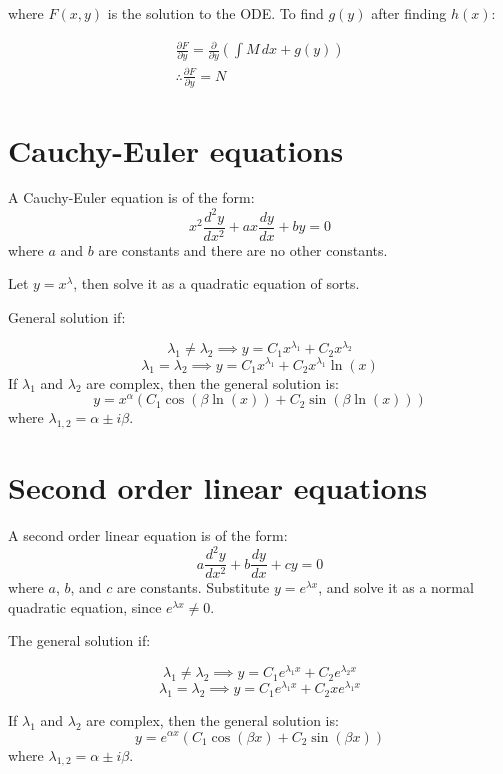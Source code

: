 \documentclass{scrartcl}
\begin{document}
where \(F(x,y)\) is the solution to the ODE. To find \(g(y)\) after finding \(h(x)\):

\begin{center}
    \begin{gather}
            \frac{\partial F}{\partial y} = \frac{\partial}{\partial y}\left(\int M \, dx + g(y)\right) \\
            \therefore{} \frac{\partial F}{\partial y} = N
    \end{gather}
\end{center}

\section{Cauchy-Euler equations}
A Cauchy-Euler equation is of the form:
\[
x^2\frac{d^2y}{dx^2} + a x \frac{dy}{dx} + b y = 0
\]
where \(a\) and \(b\) are constants and there are no other constants. 

Let \(y = x^\lambda\), then solve it as a quadratic equation of sorts.

General solution if:

\[
\lambda_1 \neq \lambda_2 \implies y = C_1 x^{\lambda_1} + C_2 x^{\lambda_2}
\]
\[
\lambda_1 = \lambda_2 \implies y = C_1 x^{\lambda_1} + C_2 x^{\lambda_1} \ln(x)
\]
If \(\lambda_1\) and \(\lambda_2\) are complex, then the general solution is:
\[
y = x^{\alpha} \left( C_1 \cos(\beta \ln(x)) + C_2 \sin(\beta \ln(x)) \right)
\]
where \(\lambda_{1,2} = \alpha \pm i\beta\).

\section{Second order linear equations}
A second order linear equation is of the form:
\[
a\frac{d^2y}{dx^2} + b\frac{dy}{dx} + cy = 0
\]
where \(a\), \(b\), and \(c\) are constants.
Substitute \(y = e^{\lambda x}\), and solve it as a normal quadratic equation, since \(e^{\lambda x} \neq 0\).

The general solution if:

\[
\lambda_1 \neq \lambda_2 \implies y = C_1 e^{\lambda_1 x} + C_2 e^{\lambda_2 x}
\]
\[
\lambda_1 = \lambda_2 \implies y = C_1 e^{\lambda_1 x} + C_2 x e^{\lambda_1 x}
\]

If \(\lambda_1\) and \(\lambda_2\) are complex, then the general solution is:
\[
y = e^{\alpha x} \left( C_1 \cos(\beta x) + C_2 \sin(\beta x) \right)
\]
where \(\lambda_{1,2} = \alpha \pm i\beta\).
\end{document}
